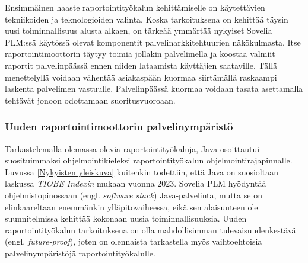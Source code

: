 Ensimmäinen haaste raportointityökalun kehittämiselle on käytettävien tekniikoiden ja teknologioiden valinta. Koska tarkoituksena on kehittää täysin uusi toiminnallisuus alusta alkaen, on tärkeää ymmärtää nykyiset Sovelia PLM:ssä käytössä olevat komponentit palvelinarkkitehtuurien näkökulmasta. Itse raportointimoottorin täytyy toimia jollakin palvelimella ja koostaa valmiit raportit palvelinpäässä ennen niiden lataamista käyttäjien saataville. Tällä menettelyllä voidaan vähentää asiakaspään kuormaa siirtämällä raskaampi laskenta palvelimen vastuulle. Palvelinpäässä kuormaa voidaan tasata asettamalla tehtävät jonoon odottamaan suoritusvuoroaan.

\subsubsection{Uuden raportointimoottorin palvelinympäristö}

Tarkastelemalla olemassa olevia raportointityökaluja, Java osoittautui suosituimmaksi ohjelmointikieleksi raportointityökalun ohjelmointirajapinnalle. Luvussa \ref{Nykyisten yleiskuva} kuitenkin todettiin, että Java on suosioltaan laskussa \textit{TIOBE Indexin} mukaan vuonna 2023. Sovelia PLM hyödyntää ohjelmistopinossaan (engl. \textit{software stack}) Java-palvelinta, mutta se on elinkaareltaan enemmänkin ylläpitovaiheessa, eikä sen alaisuuteen ole suunnitelmissa kehittää kokonaan uusia toiminnallisuuksia. Uuden raportointityökalun tarkoituksena on olla mahdollisimman tulevaisuudenkestävä (engl. \textit{future-proof}), joten on olennaista tarkastella myös vaihtoehtoisia palvelinympäristöjä raportointityökalulle.

